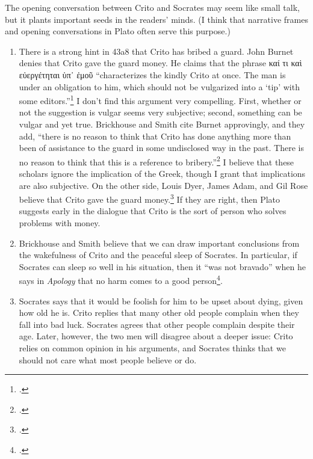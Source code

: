 \documentclass[12pt,letterpaper]{article}
\begin{document}
The opening conversation between Crito and Socrates may seem like small talk, but it plants important seeds in the readers' minds. (I think that narrative frames and opening conversations in Plato often serve this purpose.)

\begin{enumerate}

    \item There is a strong hint in 43a8 that Crito has bribed a guard. John Burnet denies that Crito gave the guard money. He claims that the phrase \textgreek{καί τι καὶ εὐεργέτηται ὑπ᾽ ἐμοῦ} ``characterizes the kindly Crito at once. The man is under an obligation to him, which should not be vulgarized into a `tip' with some editors.''\footcite[][on 43a8]{burnet1924-euthyphro-apology-crito} I don't find this argument very compelling. First, whether or not the suggestion is vulgar seems very subjective; second, something can be vulgar and yet true. Brickhouse and Smith cite Burnet approvingly, and they add, ``there is no reason to think that Crito has done anything more than been of assistance to the guard in some undisclosed way in the past. There is no reason to think that this is a reference to bribery.''\footcite[][249]{brickhouse-smith2004-plato-trial-of-socrates}  I believe that these scholars ignore the implication of the Greek, though I grant that implications are also subjective. On the other side, Louis Dyer, James Adam, and Gil Rose believe that Crito gave the guard money.\footcites[][on 43a9]{dyer-apology-crito-2007}[][on 43a9]{adam1988-crito}[][on 43a8]{rose1983} If they are right, then Plato suggests early in the dialogue that Crito is the sort of person who solves problems with money.

    \item Brickhouse and Smith believe that we can draw important conclusions from the wakefulness of Crito and the peaceful sleep of Socrates. In particular, if Socrates can sleep so well in his situation, then it ``was not bravado'' when he says in \textit{Apology} that no harm comes to a good person\footcite[][197]{brickhouse-smith2004-plato-trial-of-socrates}.

    \item Socrates says that it would be foolish for him to be upset about dying, given how old he is. Crito replies that many other old people complain when they fall into bad luck. Socrates agrees that other people complain despite their age. Later, however, the two men will disagree about a deeper issue: Crito relies on common opinion in his arguments, and Socrates thinks that we should not care what most people believe or do.


\end{enumerate}
\end{document}
